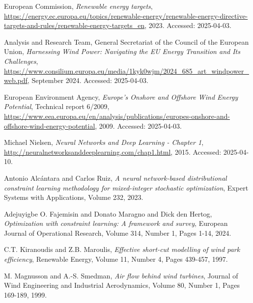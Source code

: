 \documentclass[preprint,12pt]{elsarticle}
\begin{document}
\begin{thebibliography}{00}


European Commission,
\textit{Renewable energy targets},
\url{https://energy.ec.europa.eu/topics/renewable-energy/renewable-energy-directive-targets-and-rules/renewable-energy-targets_en},
2023.
Accessed: 2025-04-03.

Analysis and Research Team, General Secretariat of the Council of the European Union,
\textit{Harnessing Wind Power: Navigating the EU Energy Transition and Its Challenges},
\url{https://www.consilium.europa.eu/media/1kyk0wjm/2024_685_art_windpower_web.pdf},
September 2024.
Accessed: 2025-04-03.

European Environment Agency,
\textit{Europe's Onshore and Offshore Wind Energy Potential},
Technical report 6/2009,
\url{https://www.eea.europa.eu/en/analysis/publications/europes-onshore-and-offshore-wind-energy-potential},
2009.
Accessed: 2025-04-03.

Michael Nielsen,
\textit{Neural Networks and Deep Learning - Chapter 1},
\url{http://neuralnetworksanddeeplearning.com/chap1.html},
2015.
Accessed: 2025-04-10.



Antonio Alcántara and Carlos Ruiz,
\textit{A neural network-based distributional constraint learning methodology for mixed-integer stochastic optimization},
Expert Systems with Applications,
Volume 232,
2023.

Adejuyigbe O. Fajemisin and Donato Maragno and Dick den Hertog,
\textit{Optimization with constraint learning: A framework and survey},
European Journal of Operational Research,
Volume 314,
Number 1,
Pages 1-14,
2024.




C.T. Kiranoudis and Z.B. Maroulis,
\textit{Effective short-cut modelling of wind park efficiency},
Renewable Energy,
Volume 11,
Number 4,
Pages 439-457,
1997.

M. Magnusson and A.-S. Smedman,
\textit{Air flow behind wind turbines},
Journal of Wind Engineering and Industrial Aerodynamics,
Volume 80,
Number 1,
Pages 169-189,
1999.


\end{thebibliography}
\end{document}
